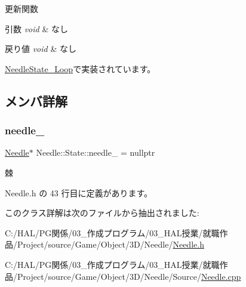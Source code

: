 更新関数 


\begin{DoxyParams}{引数}
{\em void} & なし \\
\hline
\end{DoxyParams}

\begin{DoxyRetVals}{戻り値}
{\em void} & なし \\
\hline
\end{DoxyRetVals}


\mbox{\hyperlink{class_needle_state___loop_ace1091782491ee594b53bf08bb9bcf12}{Needle\+State\+\_\+\+Loop}}で実装されています。



\subsection{メンバ詳解}
\mbox{\label{class_needle_1_1_state_a0e6c31e981a2dd5317e009351c389842}} 
\subsubsection{\texorpdfstring{needle\+\_\+}{needle\_}}
{\footnotesize\ttfamily \mbox{\hyperlink{class_needle}{Needle}}$\ast$ Needle\+::\+State\+::needle\+\_\+ = nullptr\hspace{0.3cm}{\ttfamily [private]}}



棘 



 Needle.\+h の 43 行目に定義があります。



このクラス詳解は次のファイルから抽出されました\+:\begin{DoxyCompactItemize}
\item 
C\+:/\+H\+A\+L/\+P\+G関係/03\+\_\+作成プログラム/03\+\_\+\+H\+A\+L授業/就職作品/\+Project/source/\+Game/\+Object/3\+D/\+Needle/\mbox{\hyperlink{_needle_8h}{Needle.\+h}}\item 
C\+:/\+H\+A\+L/\+P\+G関係/03\+\_\+作成プログラム/03\+\_\+\+H\+A\+L授業/就職作品/\+Project/source/\+Game/\+Object/3\+D/\+Needle/\+Source/\mbox{\hyperlink{_needle_8cpp}{Needle.\+cpp}}\end{DoxyCompactItemize}
